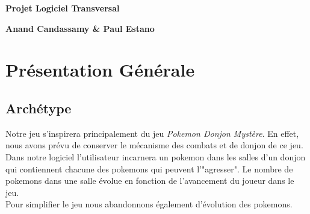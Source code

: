 \documentclass[a4paper,12pt]{article}
\begin{document}
    \thispagestyle{empty}

    \begin{titlepage}

        \vspace*{2cm}

        \begin{center}\textbf{\Huge Projet Logiciel Transversal}\end{center}{\Large \par}

        \begin{center}\textbf{\large Anand Candassamy \& Paul Estano}\end{center}{\large \par}

        \vspace{2cm}

        \clearpage

        {\small
        \tableofcontents
        }

    \end{titlepage}

    \clearpage
    \section{Présentation Générale}

    \subsection{Archétype}
	    Notre jeu s'inspirera principalement du jeu \emph{Pokemon Donjon Mystère}. En effet, nous avons prévu de conserver le mécanisme des combats et de donjon de ce jeu.
	    \\Dans notre logiciel l'utilisateur incarnera un pokemon dans les salles d'un donjon qui contiennent chacune des pokemons qui peuvent l'"agresser". Le nombre de pokemons dans une salle évolue en fonction de l'avancement du joueur dans le jeu. 
	    \\Pour simplifier le jeu nous abandonnons également d'évolution des pokemons.
\end{document}
